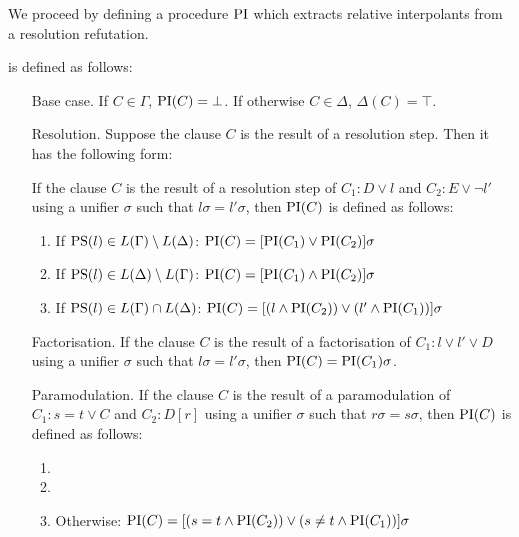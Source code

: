 We proceed by defining a procedure $\mathrm{PI}$ which extracts relative interpolants from a resolution refutation.

\begin{defi}
	 is defined as follows:
	\label{def:PI}
\begin{itemize}
	\item[Base case.]
		If $C \in \Gamma$, $\mathrm{PI}(C) = \bot$. 
		If otherwise $C \in \Delta$, $\Delta(C) = \top$. 
	\item[Resolution.]
		Suppose the clause $C$ is the result of a resolution step. Then it has the following form: 

		If the clause $C$ is the result of a resolution step of $C_1: D \lor l$ and $C_2: E \lor \lnot l'$ using a unifier $\sigma$ such that $l\sigma = l'\sigma$, then $\mathrm{PI}(C)$ is defined as follows:
		\begin{enumerate}
			\item If $\mathrm{PS}(l) \in L(\Gamma) \setminus L(\Delta)$: $\mathrm{PI}(C) = [\mathrm{PI}(C_1) \lor \mathrm{PI}(C_2)]\sigma$
			\item If $\mathrm{PS}(l) \in L(\Delta) \setminus L(\Gamma)$: $\mathrm{PI}(C) = [\mathrm{PI}(C_1) \land \mathrm{PI}(C_2)]\sigma$
			\item If $\mathrm{PS}(l) \in L(\Gamma) \cap L(\Delta)$: $\mathrm{PI}(C) = [(l \land \mathrm{PI}(C_2)) \lor (l' \land \mathrm{PI}(C_1)) ]\sigma $
		\end{enumerate}

	\item[Factorisation.]
		If the clause $C$ is the result of a factorisation of $C_1: l \lor l' \lor D$ using a unifier $\sigma$ such that $l\sigma = l'\sigma$, then $\mathrm{PI}(C) = \mathrm{PI}(C_1)\sigma$.

	\item[Paramodulation.]
		If the clause $C$ is the result of a paramodulation of $C_1: s=t \lor C$ and $C_2: D[r]$ using a unifier $\sigma$ such that $r\sigma = s\sigma$, then $\mathrm{PI}(C)$ is defined as follows: 
		\begin{enumerate}
			\item
			\item
			\item Otherwise: $\mathrm{PI}(C) = [ ( s=t \land \mathrm{PI}(C_2) ) \lor (s\neq t \land \mathrm{PI}(C_1)) ]\sigma$
		\end{enumerate}
\end{itemize}
\end{defi}


